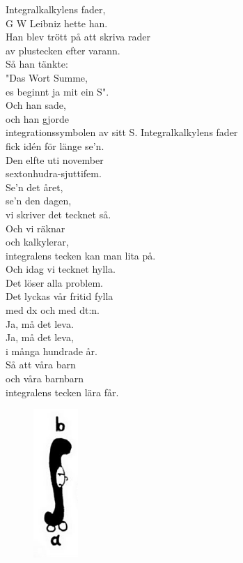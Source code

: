 \documentclass[a6paper,10pt]{article}
\begin{document}
\begin{lyrics}
Integralkalkylens fader, \\
G W Leibniz hette han. \\
Han blev trött på att skriva rader \\
av plustecken efter varann. 
\vspace{5pt}\\
Så han tänkte: \\
"Das Wort Summe, \\
es beginnt ja mit ein S". \\
Och han sade, \\
och han gjorde \\
integrationssymbolen av sitt S. 
\newpage
\setlength{\oddsidemargin}{-0.47in}
\noindent
Integralkalkylens fader \\
fick idén för länge se'n. \\
Den elfte uti november \\
sextonhudra-sjuttifem. \\
Se'n det året, \\
se'n den dagen, \\
vi skriver det tecknet så. \\
Och vi räknar \\
och kalkylerar, \\
integralens tecken kan man lita på. 
\vspace{5pt} \\
Och idag vi tecknet hylla. \\
Det löser alla problem. \\
Det lyckas vår fritid fylla \\
med dx och med dt:n. \\
Ja, må det leva. \\
Ja, må det leva, \\
i många hundrade år. \\
Så att våra barn \\
och våra barnbarn \\
integralens tecken lära får. 
\end{lyrics}
\vspace{-10pt}
\begin{figure}[!h]
\hspace{30pt}\includegraphics[width=0.15\textwidth]{integral.jpg}
\end{figure}
\end{document}
